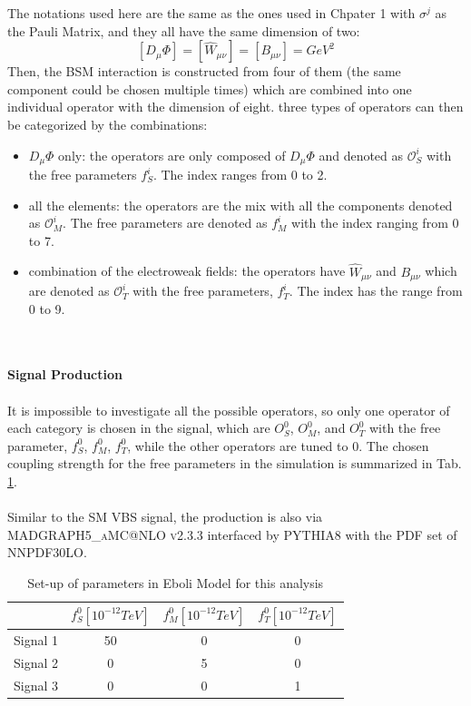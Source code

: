 The notations used here are the same as the ones used in Chpater 1 with $\sigma^j$ as the Pauli Matrix, and they all have the same dimension of two:
\begin{equation}
\left[D_{\mu}\Phi\right]=\left[\hat{W}_{\mu\nu}\right]=\left[B_{\mu\nu}\right]= GeV^2
\end{equation}
Then, the BSM interaction is constructed from four of them (the same component could be chosen multiple times) which are combined into one individual operator with the dimension of eight. three types of operators can then be categorized by the combinations:
\begin{itemize}
    \item{$D_\mu\Phi$ only}: the operators are only composed of $D_\mu\Phi$ and denoted as $\mathcal{O}^i_S$ with the free parameters $f^i_{S}$. The index ranges from 0 to 2.  
    \item{all the elements}: the operators are the mix with all the components denoted as  $\mathcal{O}^i_M$. The free parameters are denoted as $f^i_{M}$ with the index ranging from 0 to 7.
    \item{combination of the electroweak fields}: the operators have $\hat{W}_{\mu\nu}$ and $B_{\mu\nu}$ which are denoted as $\mathcal{O}_{T}^i$ with the free parameters, $f_T^i$. The index has the range from 0 to 9. 
\end{itemize}
\noindent
\\
\\{\bf Signal Production}
\\
\\It is impossible to investigate all the possible operators, so only one operator of each category is chosen in the signal, which are $O_{S}^0$, $O_{M}^0$, and $O_{T}^0$ with the free parameter, $f^0_{S}$, $f^0_{M}$,  $f_T^0$, while the other operators are tuned to 0.  The chosen coupling strength for the free parameters in the simulation is summarized in Tab. \ref{Tab:Eboli}.
\\
\\Similar to the SM VBS signal, the production is also via \textsc{MADGRAPH5\_aMC@NLO v2.3.3}\cite{Alwall:2014hca} interfaced by \textsc{PYTHIA8}\cite{Sjostrand:2007gs} with the PDF set of NNPDF30LO\cite{Ball:2012cx}. 
\begin{table}[h]
	\caption{Set-up of parameters in Eboli Model for this analysis} \label{Tab:Eboli}
	\begin{center}
		\begin{tabular}{ | c | c | c | c | }
		\hline
			     &   $f^0_{S}\left[10^{-12}TeV\right]$  & $f^0_{M}\left[10^{-12}TeV\right]$ & $f^0_{T}\left[10^{-12}TeV\right]$ \\
	    \hline
	    Signal 1 &        50                            & 0                                & 0 \\
	    \hline
		Signal 2 &        0                             & 5                                & 0 \\
		\hline
		Signal 3 &        0                             & 0                                & 1 \\
		\hline
		\end{tabular}
	\end{center}
\end{table}
\noindent
